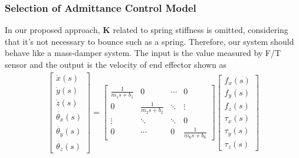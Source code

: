 \subsubsection{Selection of Admittance Control Model}
\hspace*{6mm}In our proposed approach, $\mathbf{K}$ related to spring stiffness is omitted, considering that it's not necessary to bounce such as a spring. Therefore, our system should behave like a mass-damper system. The input is the value measured by F/T sensor and the output is the velocity of end effector shown as 
\begin{equation}
\label{eq:adm_mb}
\begin{split}
\begin{bmatrix}
\dot{x}(s) \\
\dot{y}(s) \\
\dot{z}(s) \\
\dot{\theta _x}(s) \\
\dot{\theta _y}(s)\\
\dot{\theta _z}(s)
\end{bmatrix}
=
\begin{bmatrix}
\frac{1}{m_1s+b_1}&0  &\cdots  &0 \\ 
0 & \frac{1}{m_2s+b_2}  &\ddots  &\vdots \\ 
\vdots&\ddots  &\ddots  & 0\\ 
0   &\cdots & 0 & \frac{1}{m_6s+b_6}
\end{bmatrix}
\begin{bmatrix}
f_x(s)  \\
f_y(s)  \\
f_z(s)  \\
\tau _x(s) \\
\tau _y(s)  \\
\tau _z(s)  
\end{bmatrix}
\end{split}
\end{equation}

